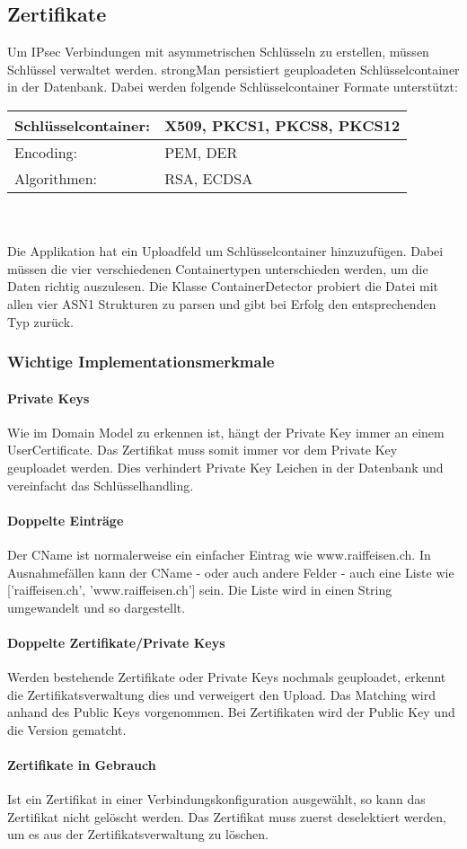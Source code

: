 \subsection{Zertifikate}
Um IPsec Verbindungen mit asymmetrischen Schlüsseln zu erstellen, müssen Schlüssel verwaltet werden. strongMan persistiert geuploadeten Schlüsselcontainer in der Datenbank.
Dabei werden folgende Schlüsselcontainer Formate unterstützt: \\

\begin{tabular}{ | p{} | p{} | }
\hline
    Schlüsselcontainer: & X509, PKCS1, PKCS8, PKCS12 \\ \hline
    Encoding: & PEM, DER \\ \hline
    Algorithmen: & RSA, ECDSA \\ \hline
\end{tabular}
\\\\
Die Applikation hat ein Uploadfeld um Schlüsselcontainer hinzuzufügen. Dabei müssen die vier verschiedenen Containertypen unterschieden werden, um die Daten richtig auszulesen. Die Klasse ContainerDetector probiert die Datei mit allen vier ASN1 Strukturen zu parsen und gibt bei Erfolg den entsprechenden Typ zurück.

\subsubsection{Wichtige Implementationsmerkmale}
\paragraph{Private Keys} Wie im Domain Model zu erkennen ist, hängt der Private Key immer an einem UserCertificate. Das Zertifikat muss somit immer vor dem Private Key geuploadet werden. Dies verhindert Private Key Leichen in der Datenbank und vereinfacht das Schlüsselhandling.

\paragraph{Doppelte Einträge} Der CName ist normalerweise ein einfacher Eintrag wie www.raiffeisen.ch. In Ausnahmefällen kann der CName - oder auch andere Felder - auch eine Liste wie ['raiffeisen.ch', 'www.raiffeisen.ch'] sein. Die Liste wird in einen String umgewandelt und so dargestellt.

\paragraph{Doppelte Zertifikate/Private Keys}
Werden bestehende Zertifikate oder Private Keys nochmals geuploadet, erkennt die Zertifikatsverwaltung dies und verweigert den Upload. Das Matching wird anhand des Public Keys vorgenommen. Bei Zertifikaten wird der Public Key und die Version gematcht.

\paragraph{Zertifikate in Gebrauch}
Ist ein Zertifikat in einer Verbindungskonfiguration ausgewählt, so kann das Zertifikat nicht gelöscht werden. Das Zertifikat muss zuerst deselektiert werden, um es aus der Zertifikatsverwaltung zu löschen.




